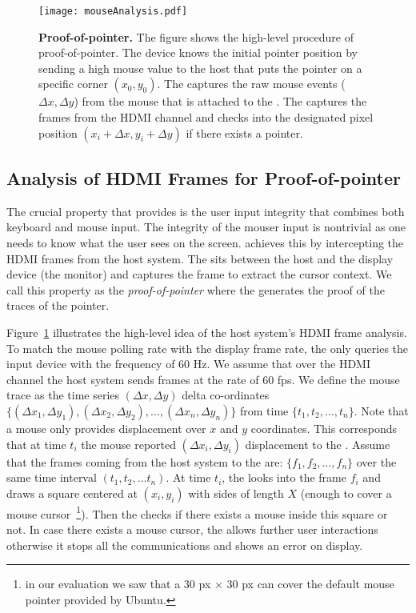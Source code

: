\begin{figure}[t]
\centering
\texttt{[image: mouseAnalysis.pdf]}
\caption{\textbf{Proof-of-pointer.} The figure shows the high-level procedure of proof-of-pointer. The device knows the initial pointer position by sending a high mouse value to the host that puts the pointer on a specific corner $(x_0, y_0)$. \one The \device captures the raw mouse events ($\Delta x, \Delta y$) from the mouse that is attached to the \device. \two The \device captures the frames from the HDMI channel and checks into the designated pixel position $(x_i + \Delta x, y_i + \Delta y)$ if there exists a pointer.}
\label{fig:mouseAnalysis}
\centering
\end{figure}

\subsection{Analysis of HDMI Frames for Proof-of-pointer}
\label{sec:systemDesign:analysis}

The crucial property that \name provides is the user input integrity that combines both keyboard and mouse input. The integrity of the mouser input is nontrivial as one needs to know what the user sees on the screen. \name achieves this by intercepting the HDMI frames from the host system. The \device sits between the host and the display device (the monitor) and captures the frame to extract the cursor context. We call this property as the \emph{proof-of-pointer} where the \device generates the proof of the traces of the pointer. 

Figure~\ref{fig:mouseAnalysis} illustrates the high-level idea of the host system's HDMI frame analysis. To match the mouse polling rate with the display frame rate, the \device only queries the input device with the frequency of $60$ Hz. We assume that over the HDMI channel the host system sends frames at the rate of $60$ fps. We define the mouse trace as the time series $(\Delta x, \Delta y)$ delta co-ordinates $\{(\Delta x_1, \Delta y_1), (\Delta x_2, \Delta y_2), \ldots, (\Delta x_n, \Delta y_n)\}$ from time $\{t_1, t_2, \ldots, t_n\}$. Note that a mouse only provides displacement over $x$ and $y$ coordinates. This corresponds that at time $t_i$ the mouse reported $(\Delta x_i, \Delta y_i)$ displacement to the \device. Assume that the frames coming from the host system to the \device are: $\{f_1, f_2, \ldots, f_n\}$ over the same time interval $(t_1, t_2,\ldots t_n)$. At time $t_i$, the \device looks into the frame $f_i$ and draws a square centered at $(x_i, y_i)$ with sides of length $X$ (enough to cover a mouse cursor~\footnote{in our evaluation we saw that a 30 px $\times$ 30 px can cover the default mouse pointer provided by Ubuntu.}). Then the \device checks if there exists a mouse inside this square or not. In case there exists a mouse cursor, the \device allows further user interactions otherwise it stops all the communications and shows an error on display.


